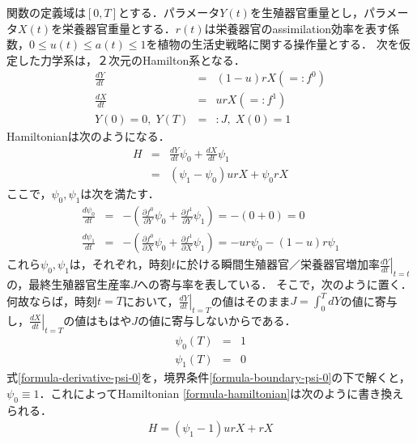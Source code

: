 \documentclass[uplatex,dvipdfmx]{jsreport}
\begin{document}
\begin{example}
    関数の定義域は$[0,T]$とする．パラメータ$Y(t)$を生殖器官重量とし，パラメータ$X(t)$を栄養器官重量とする．$r(t)$は栄養器官のassimilation効率を表す係数，$0\le u(t)\le a(t)\le 1$を植物の生活史戦略に関する操作量とする．
    次を仮定した力学系は，２次元のHamilton系となる．
    \begin{eqnarray*}
        \frac{dY}{dt} &=& (1-u)rX (=:f^0)  \\
        \frac{dX}{dt} &=& urX (=:f^1) \\
        Y(0)=0,\; Y(T)&=&:J,\;X(0)=1
    \end{eqnarray*}
    Hamiltonianは次のようになる．
    \begin{eqnarray}
        H &=& \frac{dY}{dt}\psi_0 + \frac{dX}{dt}\psi_1 \\
        &=& (\psi_1-\psi_0)urX + \psi_0rX \label{formula-hamiltonian}
    \end{eqnarray}
    ここで，$\psi_0,\psi_1$は次を満たす．
    \begin{eqnarray}
        \frac{d\psi_0}{dt} &=& - \left( \frac{\partial f^0}{\partial Y}\psi_0 + \frac{\partial f^1}{\partial Y}\psi_1 \right) = - (0+0) = 0 \label{formula-derivative-psi-0} \\
        \frac{d\psi_1}{dt} &=& - \left( \frac{\partial f^0}{\partial X}\psi_0 + \frac{\partial f^1}{\partial X}\psi_1 \right) = - ur\psi_0 - (1-u)r\psi_1
    \end{eqnarray}
    これら$\psi_0,\psi_1$は，それぞれ，時刻$t$に於ける瞬間生殖器官／栄養器官増加率$\left.\frac{dY}{dt}\right|_{t=t}$の，最終生殖器官生産率$J$への寄与率を表している\cite{Shoot/root balance of plants: Optimal growth of a system with many vegetative organs}．
    そこで，次のように置く．何故ならば，時刻$t=T$において，$\left.\frac{dY}{dt}\right|_{t=T}$の値はそのまま$J=\int^T_0dY$の値に寄与し，$\left.\frac{dX}{dt}\right|_{t=T}$の値はもはや$J$の値に寄与しないからである．
    \begin{eqnarray}
        \psi_0(T)&=&1 \label{formula-boundary-psi-0} \\
        \psi_1(T)&=&0
    \end{eqnarray}
    式\ref{formula-derivative-psi-0}を，境界条件\ref{formula-boundary-psi-0}の下で解くと，$\psi_0\equiv 1$．これによってHamiltonian \ref{formula-hamiltonian}は次のように書き換えられる．
    \begin{eqnarray}
        H = (\psi_1-1)urX+rX
    \end{eqnarray}

\end{example}
\end{document}

